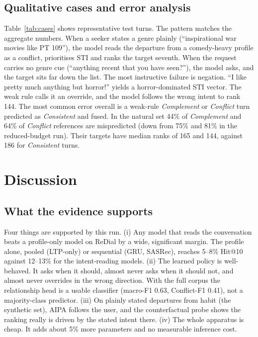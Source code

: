 \begin{table}[t]
  \centering
  \caption{Model size and cost (CPU only).}
  \label{tab:eff}
  \scriptsize
  \resizebox{\columnwidth}{!}{}
\end{table}

\subsection{Qualitative cases and error analysis}
Table~\ref{tab:cases} shows representative test turns. The pattern matches the aggregate numbers. When a seeker states a genre plainly (``inspirational war movies like PT 109''), the model reads the departure from a comedy-heavy profile as a conflict, prioritises STI and ranks the target seventh. When the request carries no genre cue (``anything recent that you have seen?''), the model asks, and the target sits far down the list. The most instructive failure is negation. ``I like pretty much anything but horror!'' yields a horror-dominated STI vector. The weak rule calls it an override, and the model follows the wrong intent to rank 144. The most common error overall is a weak-rule \emph{Complement} or \emph{Conflict} turn predicted as \emph{Consistent} and fused. In the natural set 44\% of \emph{Complement} and 64\% of \emph{Conflict} references are mispredicted (down from 75\% and 81\% in the reduced-budget run). Their targets have median ranks of 165 and 144, against 186 for \emph{Consistent} turns.

\begin{table}[t]
  \centering
  \caption{Selected test turns (N natural, S synthetic). Reference labels are weak-rule labels. ``Rank'' is the rank of the true target under AIPA (full).}
  \label{tab:cases}
  \scriptsize
  \resizebox{\textwidth}{!}{}
\end{table}

\section{Discussion}
\label{sec:discussion}
\subsection{What the evidence supports}
Four things are supported by this run. (i) Any model that reads the conversation beats a profile-only model on ReDial by a wide, significant margin. The profile alone, pooled (LTP-only) or sequential (GRU, SASRec), reaches 5--8\% Hit@10 against 12--13\% for the intent-reading models. (ii) The learned policy is well-behaved. It asks when it should, almost never asks when it should not, and almost never overrides in the wrong direction. With the full corpus the relationship head is a usable classifier (macro-F1 0.63, Conflict-F1 0.41), not a majority-class predictor. (iii) On plainly stated departures from habit (the synthetic set), AIPA follows the user, and the counterfactual probe shows the ranking really is driven by the stated intent there. (iv) The whole apparatus is cheap. It adds about 5\% more parameters and no measurable inference cost.

